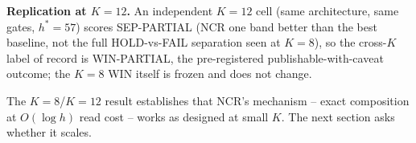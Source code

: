 \textbf{Replication at $K{=}12$.} An independent $K{=}12$ cell (same
architecture, same gates, $h^\ast{=}57$) scores SEP-PARTIAL (NCR one band
better than the best baseline, not the full HOLD-vs-FAIL separation seen
at $K{=}8$), so the cross-$K$ label of record is WIN-PARTIAL, the
pre-registered publishable-with-caveat outcome; the $K{=}8$ WIN itself is
frozen and does not change. %

The $K{=}8$/$K{=}12$ result establishes that NCR's mechanism -- exact
composition at $O(\log h)$ read cost -- works as designed at small $K$.
The next section asks whether it scales.

